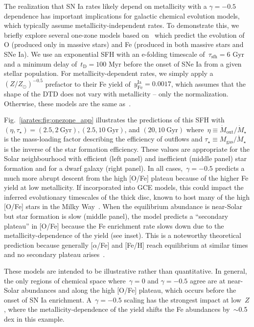 The realization that SN Ia rates likely depend on metallicity with a
$\gamma = -0.5$ dependence has important implications for galactic chemical
evolution models, which typically assume metallicity-independent rates.
To demonstrate this, we briefly explore several one-zone models based
on~\citet{Johnson2020} which predict the evolution of O (produced only in
massive stars) and Fe (produced in both massive stars and SNe Ia).
We use an exponential SFH with an e-folding timescale of~$\tau_\text{sfh} = 6$
Gyr and a minimum delay of~$t_\text{D} = 100$ Myr before the onset of SNe Ia
from a given stellar population.
For metallicity-dependent rates, we simply apply a~$(Z / Z_\odot)^{-0.5}$
prefactor to their Fe yield of~$y_\text{Fe}^\text{Ia} = 0.0017$, which assumes
that the shape of the DTD does not vary with metallicity -- only the
normalization.
Otherwise, these models are the same as~\citet{Johnson2020}.
\par
Fig.~\ref{iarates:fig:onezone_app} illustrates the predictions of this SFH with
$(\eta, \tau_\star) = (2.5, 2~\text{Gyr}), (2.5, 10~\text{Gyr})$, and
$(20, 10~\text{Gyr})$ where~$\eta \equiv \dot{M}_\text{out} / \dot{M}_\star$ is
the mass-loading factor describing the efficiency of outflows and
$\tau_\star \equiv M_\text{gas} / \dot{M}_\star$ is the inverse of the
star formation efficiency.
These values are appropriate for the Solar neighbourhood with efficient (left
panel) and inefficient (middle panel) star formation and for a dwarf galaxy
(right panel).
In all cases,~$\gamma = -0.5$ predicts a much more abrupt descent from the
high [O/Fe] plateau because of the higher Fe yield at low metallicity.
If incorporated into GCE models, this could impact the inferred evolutionary
timescales of the thick disc, known to host many of the high [O/Fe] stars in
the Milky Way~\citep{Hayden2017}.
When the equilibrium abundance is near-Solar but star formation is slow (middle
panel), the model predicts a ``secondary plateau'' in [O/Fe] because the Fe
enrichment rate slows down due to the metallicity-dependence of the yield
(see inset).
This is a noteworthy theoretical prediction because generally
[$\alpha$/Fe] and [Fe/H] reach equilibrium at similar times and no secondary
plateau arises~\citep[e.g.,][]{Weinberg2017b}.
\par
These models are intended to be illustrative rather than quantitative.
In general, the only regions of chemical space where~$\gamma = 0$ and
$\gamma = -0.5$ agree are at near-Solar abundances and along the high [O/Fe]
plateau, which occurs before the onset of SN Ia enrichment.
A~$\gamma = -0.5$ scaling has the strongest impact at low~$Z$, where the
metallicity-dependence of the yield shifts the Fe abundances by~$\sim$0.5 dex
in this example.

